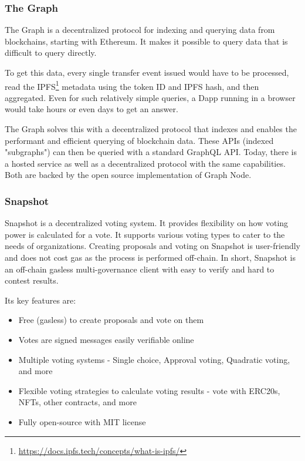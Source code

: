 \documentclass[MSE,Master,english]{twbook}%
\begin{document}
\subsubsection{The Graph}
The Graph\cite{thegraph} is a decentralized protocol for indexing and querying data from blockchains, starting with Ethereum. It makes it possible to query data that is difficult to query directly.

To get this data, every single transfer event issued would have to be processed, read the IPFS\footnote{\url{https://docs.ipfs.tech/concepts/what-is-ipfs/}} metadata using the token ID and IPFS hash, and then aggregated. Even for such relatively simple queries, a \ac{Dapp} running in a browser would take hours or even days to get an answer.

The Graph solves this with a decentralized protocol that indexes and enables the performant and efficient querying of blockchain data. These APIs (indexed "subgraphs") can then be queried with a standard GraphQL API. Today, there is a hosted service as well as a decentralized protocol with the same capabilities. Both are backed by the open source implementation of Graph Node.

\subsubsection{Snapshot}
Snapshot\cite{snapshot} is a decentralized voting system. It provides flexibility on how voting power is calculated for a vote. It supports various voting types to cater to the needs of organizations. Creating proposals and voting on Snapshot is user-friendly and does not cost gas as the process is performed off-chain.
In short, Snapshot is an off-chain gasless multi-governance client with easy to verify and hard to contest results.

Its key features are: \\
\begin{itemize}
  \item Free (gasless) to create proposals and vote on them
  \item Votes are signed messages easily verifiable online
  \item Multiple voting systems - Single choice, Approval voting, Quadratic voting, and more
  \item Flexible voting strategies to calculate voting results - vote with ERC20s, NFTs, other contracts, and more
  \item Fully open-source with MIT license
\end{itemize}
\end{document}
